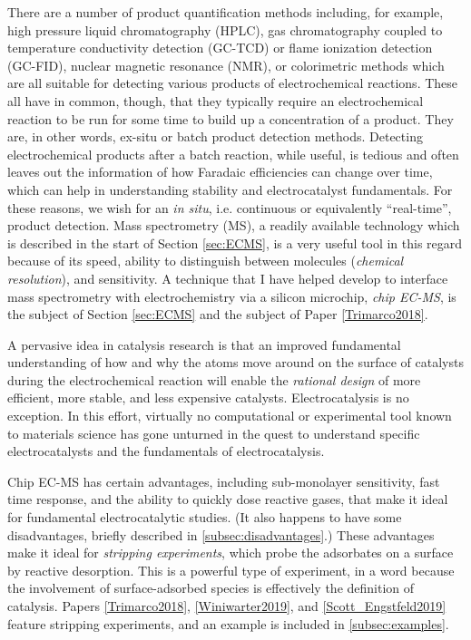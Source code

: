 There are a number of product quantification methods including, for example, high pressure liquid chromatography (HPLC), gas chromatography coupled to temperature conductivity detection (GC-TCD) or flame ionization detection (GC-FID), nuclear magnetic resonance (NMR), or colorimetric methods which are all suitable for detecting various products of electrochemical reactions. These all have in common, though, that they typically require an electrochemical reaction to be run for some time to build up a concentration of a product. They are, in other words, ex-situ or batch product detection methods. Detecting electrochemical products after a batch reaction, while useful, is tedious and often leaves out the information of how Faradaic efficiencies can change over time, which can help in understanding stability and electrocatalyst fundamentals. For these reasons, we wish for an \textit{in situ}, i.e. continuous or equivalently ``real-time'', product detection. Mass spectrometry (MS), a readily available technology which is described in the start of Section \ref{sec:ECMS}, is a very useful tool in this regard because of its speed, ability to distinguish between molecules (\textit{chemical resolution}), and sensitivity. A technique that I have helped develop to interface mass spectrometry with electrochemistry via a silicon microchip, \textit{chip EC-MS}, is the subject of Section \ref{sec:ECMS} and the subject of Paper \ref{Trimarco2018}.

A pervasive idea in catalysis research is that an improved fundamental understanding of how and why the atoms move around on the surface of catalysts during the electrochemical reaction will enable the \textit{rational design} of more efficient, more stable, and less expensive catalysts\cite{Fundamentals2014}. Electrocatalysis is no exception\cite{Pfisterer2017, Katsounaros2014a, Wuttig2016, Seh2017}. In this effort, virtually no computational or experimental tool known to materials science has gone unturned in the quest to understand specific electrocatalysts and the fundamentals of electrocatalysis. 

Chip EC-MS has certain advantages, including sub-monolayer sensitivity, fast time response, and the ability to quickly dose reactive gases, that make it ideal for fundamental electrocatalytic studies. (It also happens to have some disadvantages, briefly described in \ref{subsec:disadvantages}.) These advantages make it ideal for \textit{stripping experiments}, which probe the adsorbates on a surface by reactive desorption. This is a powerful type of experiment, in a word because the involvement of surface-adsorbed species is effectively the definition of catalysis. Papers \ref{Trimarco2018}, \ref{Winiwarter2019}, and \ref{Scott_Engstfeld2019} feature stripping experiments, and an example is included in \ref{subsec:examples}.

